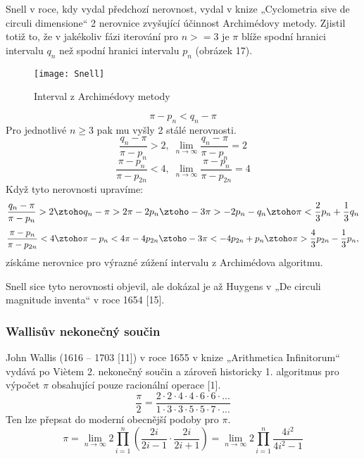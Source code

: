 \documentclass[soc]{gzwroc} %
\begin{document}
Snell v roce, kdy vydal předchozí nerovnost, vydal v knize „Cyclometria sive de circuli dimensione“ 2 nerovnice zvyšující účinnost Archimédovy metody. Zjistil totiž to, že v jakékoliv fázi iterování pro $n>=3$ je $\pi$ blíže spodní hranici intervalu $q_n$ než spodní hranici intervalu $p_n$ (obrázek 17).
\begin{figure}[!ht]
\texttt{[image: Snell]}
\caption{Interval z Archimédovy metody}
\label{fig:kruh}
\end{figure}
$$
\pi-p_n<q_n-\pi
$$
Pro jednotlivé $n\geq3$ pak mu vyšly 2 stálé nerovnosti.
\begin{equation}
\frac{q_n-\pi}{\pi-p_n}>2, \; \lim_{n\to\infty} \frac{q_n-\pi}{\pi-p_n}=2
\end{equation}
\begin{equation}
\frac{\pi-p_n}{\pi-p_{2n}}<4, \; \lim_{n\to\infty} \frac{\pi-p_n}{\pi-p_{2n}}=4
\end{equation}
Když tyto nerovnosti upravíme:
$$
\frac{q_n-\pi}{\pi-p_n}>2 \ztoho q_n-\pi>2\pi-2p_n \ztoho -3\pi>-2p_n-q_n \ztoho \pi<\frac{2}{3}p_n+\frac{1}{3}q_n
$$
$$
\frac{\pi-p_n}{\pi-p_{2n}}<4 \ztoho \pi-p_n<4\pi-4p_{2n} \ztoho -3\pi<-4p_{2n}+p_n \ztoho \pi>\frac{4}{3}p_{2n}-\frac{1}{3}p_n,
$$
získáme nerovnice pro výrazné zúžení intervalu z Archimédova algoritmu.

Snell sice tyto nerovnosti objevil, ale dokázal je až Huygens v „De circuli magnitude inventa“ v roce 1654 [15].
\subsubsection{Wallisův nekonečný součin}
John Wallis (1616 – 1703 [11]) v roce 1655 v knize „Arithmetica Infinitorum“ vydává po Viètem 2. nekonečný součin a zároveň historicky 1. algoritmus pro výpočet $\pi$ obsahující pouze racionální operace [1].
\begin{equation}
\frac{\pi}{2}=\frac{2\cdot2\cdot4\cdot4\cdot6\cdot6\cdot...}{1\cdot3\cdot3\cdot5\cdot5\cdot7\cdot...}
\end{equation}
Ten lze přepsat do moderní obecnější podoby pro $\pi$.
\begin{equation}
\pi=\lim_{n\to\infty}2\prod_{i=1}^{n} \left(\frac{2i}{2i-1}\cdot\frac{2i}{2i+1} \right)=\lim_{n\to\infty}2\prod_{i=1}^{n} \frac{4i^2}{4i^2-1}
\end{equation}
\end{document}
